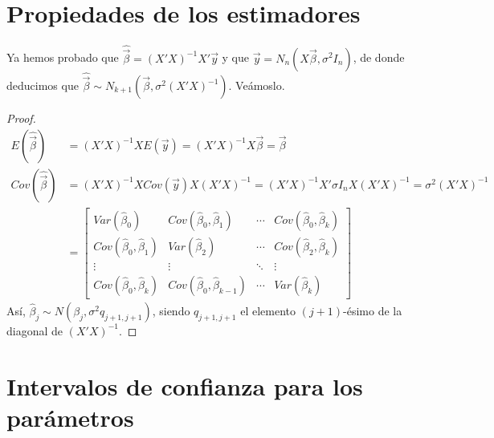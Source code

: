 \section{Propiedades de los estimadores}
Ya hemos probado que $\widehat{\vec{\beta}} = (X'X)^{-1}X'\vec{y}$ y que $\vec{y} = N_n(X\vec{\beta}, \sigma^2 I_n)$, de donde deducimos que $\widehat{\vec{\beta}} \sim N_{k+1}(\vec{\beta}, \sigma^2 (X'X)^{-1})$. Veámoslo.
\begin{proof}
    \begin{align*}
        E(\widehat{\vec{\beta}})   & = (X'X)^{-1}XE(\vec{y}) = (X'X)^{-1}X\vec{\beta} = \vec{\beta}                                                                                  \\
        Cov(\widehat{\vec{\beta}}) & = (X'X)^{-1}XCov(\vec{y})X(X'X)^{-1} = (X'X)^{-1}X'\sigma I_n X(X'X)^{-1} = \sigma^2 (X'X)^{-1}                                                 \\
                                   & = \begin{bmatrix}
                                           Var(\widehat{\beta}_0)                   & Cov(\widehat{\beta}_0, \widehat{\beta}_1)     & \cdots & Cov(\widehat{\beta}_0, \widehat{\beta}_k) \\
                                           Cov(\widehat{\beta}_0,\widehat{\beta}_1) & Var(\widehat{\beta}_2)                        & \cdots & Cov(\widehat{\beta}_2, \widehat{\beta}_k) \\
                                           \vdots                                   & \vdots                                        & \ddots & \vdots                                    \\
                                           Cov(\widehat{\beta}_0,\widehat{\beta}_k) & Cov(\widehat{\beta}_0, \widehat{\beta}_{k-1}) & \cdots & Var(\widehat{\beta}_k)
                                       \end{bmatrix}
    \end{align*}
    Así, $\widehat{\beta}_j \sim N(\beta_j, \sigma^2{q_{j+1,j+1}})$, siendo $q_{j+1,j+1}$ el elemento $(j+1)$-ésimo de la diagonal de $(X'X)^{-1}$.
\end{proof}

\section{Intervalos de confianza para los parámetros}

